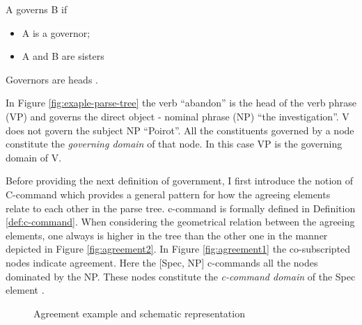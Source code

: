     \begin{definition}[government i]\label{def:government-i}
         A governs B if 
         \begin{itemize}
             \item A is a governor;
             \item A and B are sisters
         \end{itemize}
         Governors are heads \citep[86]{Haegeman1991}.
    \end{definition}

    In Figure \ref{fig:exaple-parse-tree} the verb ``abandon'' is the head of the verb phrase (VP) and governs the direct object - nominal phrase (NP) ``the investigation''. V does not govern the subject NP ``Poirot''. All the constituents governed by a node constitute the \textit{governing domain} of that node. In this case VP is the governing domain of V.

    Before providing the next definition of government, I first introduce the notion of C-command which provides a general pattern for how the agreeing elements relate to each other in the parse tree. c-command is formally defined in Definition \ref{def:c-command}. When considering the geometrical relation between the agreeing elements, one always is higher in the tree than the other one in the manner depicted in Figure \ref{fig:agreement2}. In Figure \ref{fig:agreement1} the co-subscripted nodes indicate agreement. Here the [Spec, NP] c-commands all the nodes dominated by the NP. These nodes constitute the \textit{c-command domain} of the Spec element \citep[134]{Haegeman1991}. 


    \begin{figure}[!ht]
        \centering
        \caption{Agreement example and schematic representation }
        \label{fig:agreement}
    \end{figure}
    

